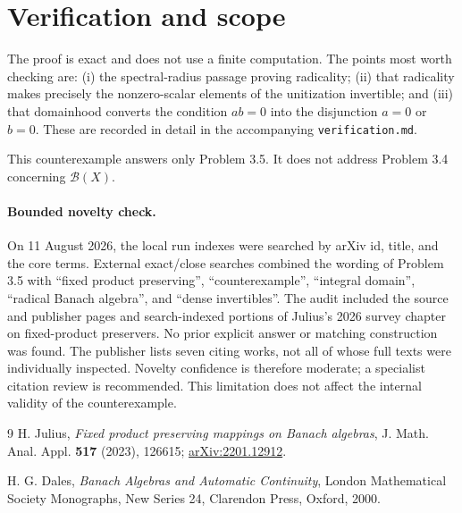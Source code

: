 \documentclass[11pt]{article}
\begin{document}
\section{Verification and scope}

The proof is exact and does not use a finite computation. The points most
worth checking are: (i) the spectral-radius passage proving radicality;
(ii) that radicality makes precisely the nonzero-scalar elements of the
unitization invertible; and (iii) that domainhood converts the condition
$ab=0$ into the disjunction $a=0$ or $b=0$. These are recorded in detail in
the accompanying \texttt{verification.md}.

This counterexample answers only Problem 3.5. It does not address Problem
3.4 concerning $\mathcal B(X)$.

\paragraph{Bounded novelty check.}
On 11 August 2026, the local run indexes were searched by arXiv id, title,
and the core terms. External exact/close searches combined the wording of
Problem 3.5 with ``fixed product preserving'', ``counterexample'', ``integral
domain'', ``radical Banach algebra'', and ``dense invertibles''. The audit
included the source and publisher pages and search-indexed portions of
Julius's 2026 survey chapter on fixed-product preservers. No prior explicit
answer or matching construction was found. The publisher lists seven citing
works, not all of whose full texts were individually inspected. Novelty
confidence is therefore moderate; a specialist citation review is
recommended. This limitation does not affect the internal validity of the
counterexample.

\begin{thebibliography}{9}
H. Julius,
\emph{Fixed product preserving mappings on Banach algebras},
J. Math. Anal. Appl. \textbf{517} (2023), 126615;
\href{https://arxiv.org/abs/2201.12912}{arXiv:2201.12912}.

H. G. Dales,
\emph{Banach Algebras and Automatic Continuity},
London Mathematical Society Monographs, New Series 24,
Clarendon Press, Oxford, 2000.
\end{thebibliography}
\end{document}
